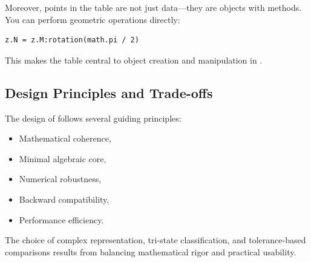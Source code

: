 Moreover, points in the  table are not just data—they are objects with methods. You can perform geometric operations directly:

\begin{verbatim}
z.N = z.M:rotation(math.pi / 2)
\end{verbatim}

This makes the  table central to object creation and manipulation in .



\subsection{Design Principles and Trade-offs}


The design of  follows several guiding principles:

\begin{itemize}
\item Mathematical coherence,
\item Minimal algebraic core,
\item Numerical robustness,
\item Backward compatibility,
\item Performance efficiency.
\end{itemize}

The choice of complex representation, tri-state classification,
and tolerance-based comparisons results from balancing
mathematical rigor and practical usability.